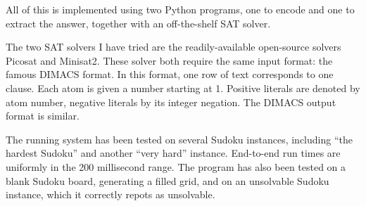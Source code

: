 \documentclass{article}
\begin{document}
All of this is implemented using two Python programs, one to
encode and one to extract the answer, together with an
off-the-shelf SAT solver.

The two SAT solvers I have tried are the readily-available
open-source solvers Picosat and Minisat2. These solver both
require the same input format: the famous DIMACS format. In
this format, one row of text corresponds to one clause. Each
atom is given a number starting at 1. Positive literals are
denoted by atom number, negative literals by its integer
negation. The DIMACS output format is similar.

The running system has been tested on several Sudoku
instances, including ``the hardest Sudoku'' and another
``very hard'' instance. End-to-end run times are uniformly
in the 200 millisecond range. The program has also been
tested on a blank Sudoku board, generating a filled grid,
and on an unsolvable Sudoku instance, which it correctly
repots as unsolvable.
\end{document}
